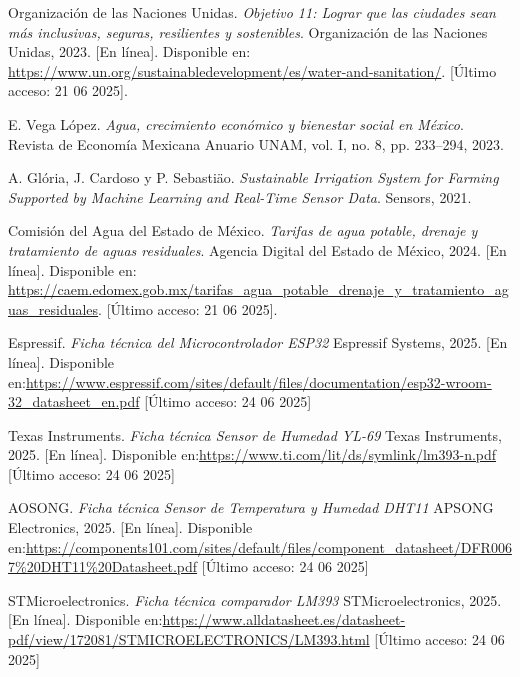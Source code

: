 \documentclass[pdflatex,sn-mathphys-num]{sn-jnl}%
\theoremstyle{thmstyleone}%
\theoremstyle{thmstyletwo}%
\theoremstyle{thmstylethree}%
\begin{document}
\begin{multicols}{2}
\begin{thebibliography}{4}


Organización de las Naciones Unidas.
\textit{Objetivo 11: Lograr que las ciudades sean más inclusivas, seguras, resilientes y sostenibles}.
Organización de las Naciones Unidas, 2023.
[En línea]. Disponible en: \url{https://www.un.org/sustainabledevelopment/es/water-and-sanitation/}.
[Último acceso: 21 06 2025].

E. Vega López.
\textit{Agua, crecimiento económico y bienestar social en México}.
Revista de Economía Mexicana Anuario UNAM, vol. I, no. 8, pp. 233–294, 2023.

A. Glória, J. Cardoso y P. Sebastiäo.
\textit{Sustainable Irrigation System for Farming Supported by Machine Learning and Real-Time Sensor Data}.
Sensors, 2021.

Comisión del Agua del Estado de México.
\textit{Tarifas de agua potable, drenaje y tratamiento de aguas residuales}.
Agencia Digital del Estado de México, 2024.
[En línea]. Disponible en: \url{https://caem.edomex.gob.mx/tarifas_agua_potable_drenaje_y_tratamiento_aguas_residuales}.
[Último acceso: 21 06 2025].


Espressif.
\textit{Ficha técnica del Microcontrolador ESP32}
Espressif Systems, 2025.
[En línea]. Disponible en:\url{https://www.espressif.com/sites/default/files/documentation/esp32-wroom-32_datasheet_en.pdf}
[Último acceso: 24 06 2025] 

Texas Instruments.
\textit{Ficha técnica Sensor de Humedad YL-69}
Texas Instruments, 2025.
[En línea]. Disponible en:\url{https://www.ti.com/lit/ds/symlink/lm393-n.pdf}
[Último acceso: 24 06 2025] 

AOSONG.
\textit{Ficha técnica Sensor de Temperatura y Humedad DHT11}
APSONG Electronics, 2025.
[En línea]. Disponible en:\url{https://components101.com/sites/default/files/component_datasheet/DFR0067%20DHT11%20Datasheet.pdf}
[Último acceso: 24 06 2025] 

STMicroelectronics.
\textit{Ficha técnica comparador LM393}
STMicroelectronics, 2025.
[En línea]. Disponible en:\url{https://www.alldatasheet.es/datasheet-pdf/view/172081/STMICROELECTRONICS/LM393.html}
[Último acceso: 24 06 2025] 


\end{thebibliography}
\end{multicols}
\end{document}

